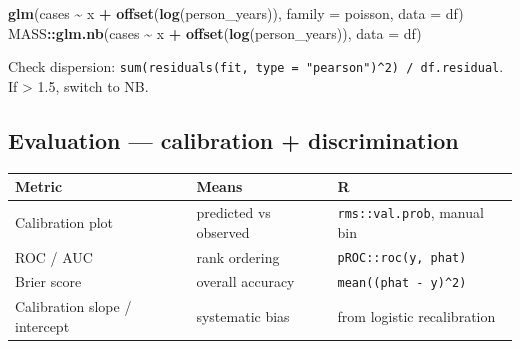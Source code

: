 \documentclass[
]{article}
\newenvironment{Shaded}{\begin{snugshade}}{\end{snugshade}}
\newcommand{\AttributeTok}[1]{\textcolor[rgb]{0.13,0.29,0.53}{#1}}
\newcommand{\FunctionTok}[1]{\textcolor[rgb]{0.13,0.29,0.53}{\textbf{#1}}}
\newcommand{\NormalTok}[1]{#1}
\newcommand{\SpecialCharTok}[1]{\textcolor[rgb]{0.81,0.36,0.00}{\textbf{#1}}}
\newcounter{none} %
\begin{document}
\begin{Shaded}
\begin{Highlighting}[]
\FunctionTok{glm}\NormalTok{(cases }\SpecialCharTok{\textasciitilde{}}\NormalTok{ x }\SpecialCharTok{+} \FunctionTok{offset}\NormalTok{(}\FunctionTok{log}\NormalTok{(person\_years)),}
    \AttributeTok{family =}\NormalTok{ poisson, }\AttributeTok{data =}\NormalTok{ df)}
\NormalTok{MASS}\SpecialCharTok{::}\FunctionTok{glm.nb}\NormalTok{(cases }\SpecialCharTok{\textasciitilde{}}\NormalTok{ x }\SpecialCharTok{+} \FunctionTok{offset}\NormalTok{(}\FunctionTok{log}\NormalTok{(person\_years)), }\AttributeTok{data =}\NormalTok{ df)}
\end{Highlighting}
\end{Shaded}

Check dispersion:
\texttt{sum(residuals(fit,\ type\ =\ "pearson")\^{}2)\ /\ df.residual}.
If \textgreater{} 1.5, switch to NB.

\subsection{Evaluation --- calibration +
discrimination}\label{evaluation-calibration-discrimination}

{\def\LTcaptype{none} %
\begin{longtable}[]{@{}
  >{\raggedright\arraybackslash}p{}
  >{\raggedright\arraybackslash}p{}
  >{\raggedright\arraybackslash}p{}@{}}
\toprule\noalign{}
\begin{minipage}[b]{\linewidth}\raggedright
Metric
\end{minipage} & \begin{minipage}[b]{\linewidth}\raggedright
Means
\end{minipage} & \begin{minipage}[b]{\linewidth}\raggedright
R
\end{minipage} \\
\midrule\noalign{}
\endhead
\bottomrule\noalign{}
\endlastfoot
Calibration plot & predicted vs observed & \texttt{rms::val.prob},
manual bin \\
ROC / AUC & rank ordering & \texttt{pROC::roc(y,\ phat)} \\
Brier score & overall accuracy & \texttt{mean((phat\ -\ y)\^{}2)} \\
Calibration slope / intercept & systematic bias & from logistic
recalibration \\
\end{longtable}
}
\end{document}
